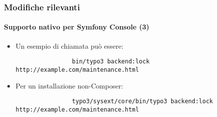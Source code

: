\begin{frame}[fragile]
	\frametitle{Modifiche rilevanti}
	\framesubtitle{Supporto nativo per Symfony Console (3)}

	\lstset{basicstyle=\tiny\ttfamily}

	\begin{itemize}

		\item Un esempio di chiamata può essere:
			\begin{lstlisting}
				bin/typo3 backend:lock http://example.com/maintenance.html
			\end{lstlisting}

		\item Per un installazione non-Composer:
			\begin{lstlisting}
				typo3/sysext/core/bin/typo3 backend:lock http://example.com/maintenance.html
			\end{lstlisting}

	\end{itemize}

\end{frame}

